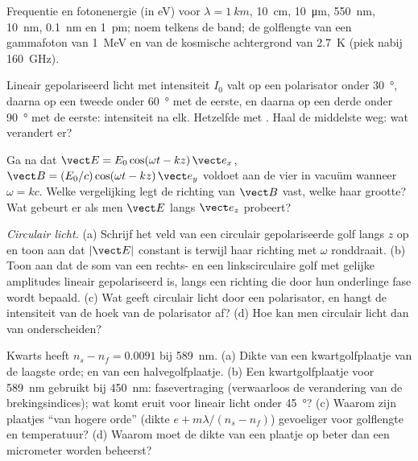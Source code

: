 \begin{exercise}[$\star$]\label{exo:b2:plane-waves-polarization:2}
Frequentie en fotonenergie (in eV) voor $\lambda = \qty{1}{km}$,
\qty{10}{cm}, \qty{10}{\micro m}, \qty{550}{nm}, \qty{10}{nm}, \qty{0.1}{nm}
en \qty{1}{pm}; noem telkens de band; de golflengte van een gammafoton van
\qty{1}{MeV} en van de kosmische achtergrond van \qty{2.7}{K} (piek nabij
\qty{160}{GHz}).
\end{exercise}

\begin{exercise}[$\star$]\label{exo:b2:plane-waves-polarization:3}
Lineair gepolariseerd licht met intensiteit $I_0$ valt op een polarisator
onder \qty{30}{\degree}, daarna op een tweede onder \qty{60}{\degree} met de
eerste, en daarna op een derde onder \qty{90}{\degree} met de eerste:
intensiteit na elk. Hetzelfde met . Haal de middelste weg:
wat verandert er?
\end{exercise}

\begin{exercise}[$\star$]\label{exo:b2:plane-waves-polarization:4}
Ga na dat $\vect E = E_0\cos(\omega t - kz)\,\vect e_x$,
$\vect B = (E_0/c)\cos(\omega t
- kz)\,\vect e_y$ voldoet aan de vier
 in vacuüm wanneer $\omega =
kc$. Welke
vergelijking legt de richting van $\vect B$ vast, welke haar grootte? Wat
gebeurt er als men $\vect E$ langs $\vect e_z$ probeert?
\end{exercise}

\begin{exercise}[$\star\star$]\label{exo:b2:plane-waves-polarization:5}
\emph{Circulair licht.} (a) Schrijf het veld van een circulair
gepolariseerde golf langs $z$ op en toon aan dat $|\vect E|$ constant is
terwijl haar richting met $\omega$ ronddraait. (b) Toon aan dat de som van
een rechts- en een linkscirculaire golf met gelijke amplitudes lineair
gepolariseerd is, langs een richting die door hun onderlinge fase wordt
bepaald. (c) Wat geeft circulair licht door een polarisator, en hangt de
intensiteit van de hoek van de polarisator af? (d) Hoe kan men circulair
licht dan van  onderscheiden?
\end{exercise}

\begin{exercise}[$\star\star$]\label{exo:b2:plane-waves-polarization:6}
Kwarts heeft $n_s - n_f = 0.0091$ bij \qty{589}{nm}. (a) Dikte van een
kwartgolfplaatje van de laagste orde; en van een halvegolfplaatje. (b) Een
kwartgolfplaatje voor \qty{589}{nm} gebruikt bij \qty{450}{nm}:
fasevertraging (verwaarloos de verandering van de brekingsindices); wat komt
eruit voor lineair licht onder \qty{45}{\degree}? (c) Waarom zijn plaatjes
``van hogere orde'' (dikte $e +
m\lambda/(n_s - n_f)$) gevoeliger voor
golflengte en temperatuur? (d) Waarom moet de dikte van een plaatje op beter
dan een micrometer worden beheerst?
\end{exercise}

